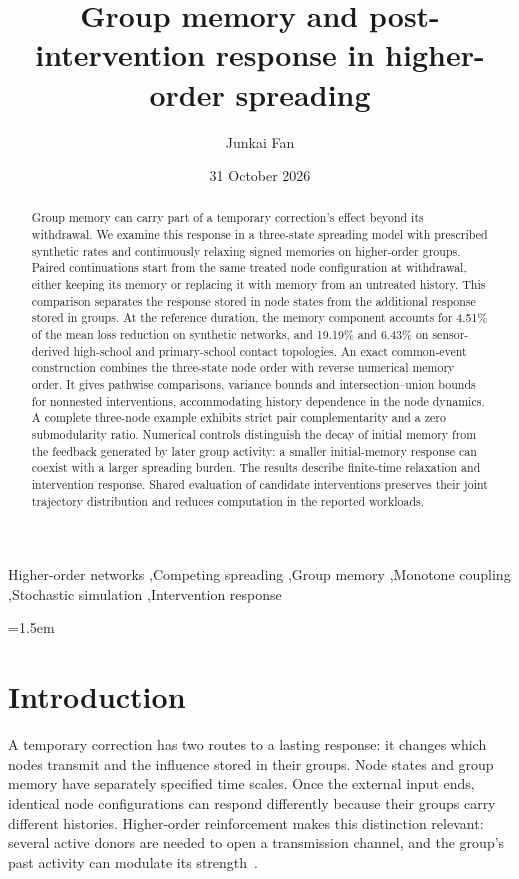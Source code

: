 \documentclass[final,5p,times,twocolumn,sort&compress]{elsarticle}
\date{31 October 2026}
\theoremstyle{plain}
\begin{document}
\begin{frontmatter}
\title{Group memory and post-intervention response in higher-order spreading}
\author[neu]{Junkai Fan}
\begin{abstract}
Group memory can carry part of a temporary correction's effect beyond its withdrawal. We examine this response in a three-state spreading model with prescribed synthetic rates and continuously relaxing signed memories on higher-order groups. Paired continuations start from the same treated node configuration at withdrawal, either keeping its memory or replacing it with memory from an untreated history. This comparison separates the response stored in node states from the additional response stored in groups. At the reference duration, the memory component accounts for 4.51\% of the mean loss reduction on synthetic networks, and 19.19\% and 6.43\% on sensor-derived high-school and primary-school contact topologies. An exact common-event construction combines the three-state node order with reverse numerical memory order. It gives pathwise comparisons, variance bounds and intersection--union bounds for nonnested interventions, accommodating history dependence in the node dynamics. A complete three-node example exhibits strict pair complementarity and a zero submodularity ratio. Numerical controls distinguish the decay of initial memory from the feedback generated by later group activity: a smaller initial-memory response can coexist with a larger spreading burden. The results describe finite-time relaxation and intervention response. Shared evaluation of candidate interventions preserves their joint trajectory distribution and reduces computation in the reported workloads.

\end{abstract}
\begin{keyword}
Higher-order networks \sep Competing spreading \sep Group memory \sep Monotone coupling \sep Stochastic simulation \sep Intervention response
\end{keyword}
\end{frontmatter}
\raggedbottom
\emergencystretch=1.5em
\section{Introduction}
A temporary correction has two routes to a lasting response: it changes which nodes transmit and the influence stored in their groups. Node states and group memory have separately specified time scales. Once the external input ends, identical node configurations can respond differently because their groups carry different histories. Higher-order reinforcement makes this distinction relevant: several active donors are needed to open a transmission channel, and the group's past activity can modulate its strength~\cite{iacopini2019,battiston2020,battiston2021}.
\end{document}
